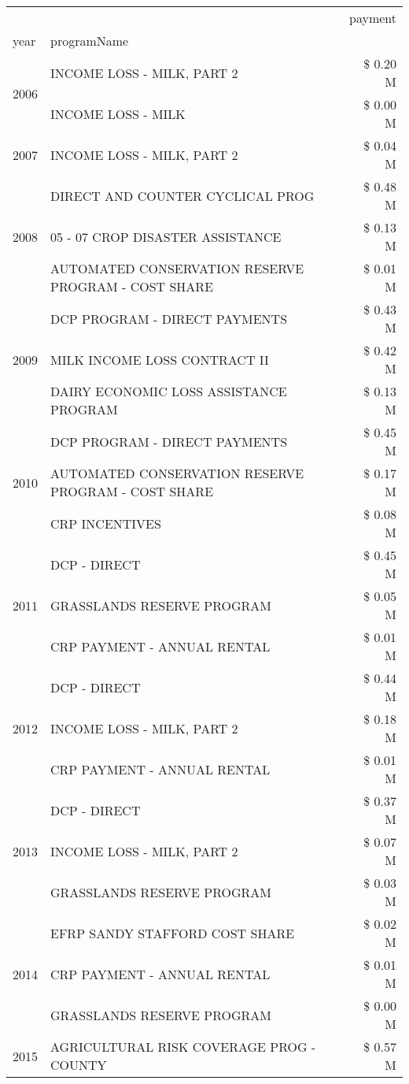 \begin{tabular}{llr}
\toprule
 &  & payment \\
year & programName &  \\
\midrule
\multirow[t]{2}{*}{2006} & INCOME LOSS - MILK, PART 2 & \$ 0.20 M \\
 & INCOME LOSS - MILK & \$ 0.00 M \\
\cline{1-3}
2007 & INCOME LOSS - MILK, PART 2 & \$ 0.04 M \\
\cline{1-3}
\multirow[t]{3}{*}{2008} & DIRECT AND COUNTER CYCLICAL PROG & \$ 0.48 M \\
 & 05 - 07 CROP DISASTER ASSISTANCE & \$ 0.13 M \\
 & AUTOMATED CONSERVATION RESERVE PROGRAM - COST SHARE & \$ 0.01 M \\
\cline{1-3}
\multirow[t]{3}{*}{2009} & DCP PROGRAM - DIRECT PAYMENTS & \$ 0.43 M \\
 & MILK INCOME LOSS CONTRACT II & \$ 0.42 M \\
 & DAIRY ECONOMIC LOSS ASSISTANCE PROGRAM & \$ 0.13 M \\
\cline{1-3}
\multirow[t]{3}{*}{2010} & DCP PROGRAM - DIRECT PAYMENTS & \$ 0.45 M \\
 & AUTOMATED CONSERVATION RESERVE PROGRAM - COST SHARE & \$ 0.17 M \\
 & CRP INCENTIVES & \$ 0.08 M \\
\cline{1-3}
\multirow[t]{3}{*}{2011} & DCP - DIRECT & \$ 0.45 M \\
 & GRASSLANDS RESERVE PROGRAM & \$ 0.05 M \\
 & CRP PAYMENT - ANNUAL RENTAL & \$ 0.01 M \\
\cline{1-3}
\multirow[t]{3}{*}{2012} & DCP - DIRECT & \$ 0.44 M \\
 & INCOME LOSS - MILK, PART 2 & \$ 0.18 M \\
 & CRP PAYMENT - ANNUAL RENTAL & \$ 0.01 M \\
\cline{1-3}
\multirow[t]{3}{*}{2013} & DCP - DIRECT & \$ 0.37 M \\
 & INCOME LOSS - MILK, PART 2 & \$ 0.07 M \\
 & GRASSLANDS RESERVE PROGRAM & \$ 0.03 M \\
\cline{1-3}
\multirow[t]{3}{*}{2014} & EFRP SANDY STAFFORD COST SHARE & \$ 0.02 M \\
 & CRP PAYMENT - ANNUAL RENTAL & \$ 0.01 M \\
 & GRASSLANDS RESERVE PROGRAM & \$ 0.00 M \\
\cline{1-3}
\multirow[t]{3}{*}{2015} & AGRICULTURAL RISK COVERAGE PROG - COUNTY & \$ 0.57 M \\

\end{tabular}
